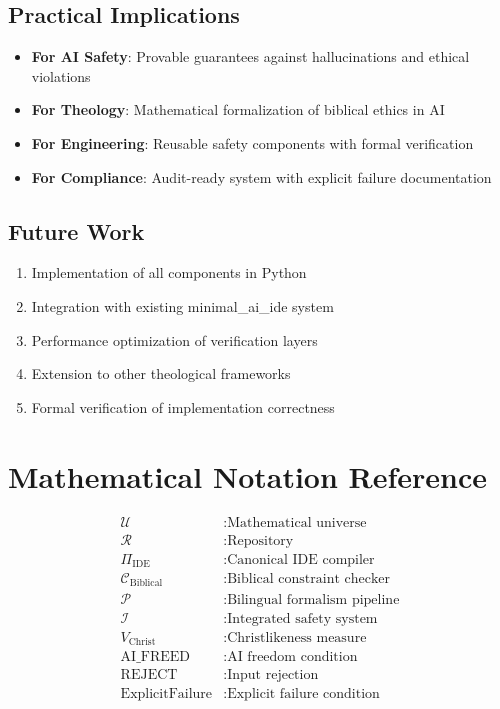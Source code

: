 \documentclass[12pt]{article}
\begin{document}
\subsection{Practical Implications}

\begin{itemize}
    \item \textbf{For AI Safety}: Provable guarantees against hallucinations and ethical violations
    \item \textbf{For Theology}: Mathematical formalization of biblical ethics in AI
    \item \textbf{For Engineering}: Reusable safety components with formal verification
    \item \textbf{For Compliance}: Audit-ready system with explicit failure documentation
\end{itemize}

\subsection{Future Work}

\begin{enumerate}
    \item Implementation of all components in Python
    \item Integration with existing minimal\_ai\_ide system
    \item Performance optimization of verification layers
    \item Extension to other theological frameworks
    \item Formal verification of implementation correctness
\end{enumerate}

\appendix

\section{Mathematical Notation Reference}

\begin{align*}
\mathcal{U} & : \text{Mathematical universe} \\
\mathcal{R} & : \text{Repository} \\
\Pi_{\text{IDE}} & : \text{Canonical IDE compiler} \\
\mathcal{C}_{\text{Biblical}} & : \text{Biblical constraint checker} \\
\mathcal{P} & : \text{Bilingual formalism pipeline} \\
\mathcal{I} & : \text{Integrated safety system} \\
V_{\text{Christ}} & : \text{Christlikeness measure} \\
\text{AI\_FREED} & : \text{AI freedom condition} \\
\text{REJECT} & : \text{Input rejection} \\
\text{ExplicitFailure} & : \text{Explicit failure condition}
\end{align*}
\end{document}
